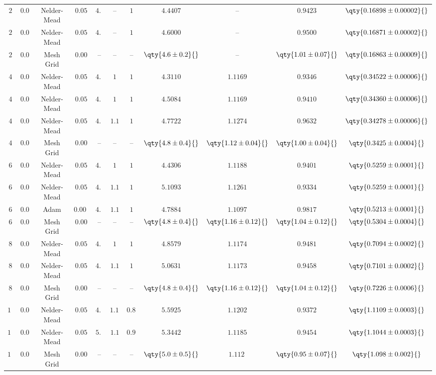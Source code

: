 \begin{tabular}{cc|ccccc|cccc}
    $2$ & $0.05$ & Nelder-Mead & $0.05$ & $4.5$ & -- & $1$ & $4.4407$ & -- & $0.9423$ & $\qty{0.16898 \pm 0.00002}{}$ \\
    \rowcolor{LightCyan}
    $2$ & $0.05$ & Nelder-Mead & $0.05$ & $4.6$ & -- & $1$ & $4.6000$ & -- & $0.9500$ & $\qty{0.16871 \pm 0.00002}{}$ \\
    $2$ & $0.05$ & Mesh Grid & $0.00$ & -- & -- & -- & $\qty{4.6 \pm 0.2}{}$ & -- & $\qty{1.01 \pm 0.07}{}$ & $\qty{0.16863 \pm 0.00009}{}$ \\
    $4$ & $0.05$ & Nelder-Mead & $0.05$ & $4.4$ & $1$ & $1$ & $4.3110$ & $1.1169$ & $0.9346$ & $\qty{0.34522 \pm 0.00006}{}$ \\
    $4$ & $0.05$ & Nelder-Mead & $0.05$ & $4.6$ & $1$ & $1$ & $4.5084$ & $1.1169$ & $0.9410$ & $\qty{0.34360 \pm 0.00006}{}$ \\
    \rowcolor{LightCyan}
    $4$ & $0.05$ & Nelder-Mead & $0.05$ & $4.7$\tnote{$\dagger$} & $1.1$ & $1$ & $4.7722$ & $1.1274$ & $0.9632$ & $\qty{0.34278 \pm 0.00006}{}$ \\
    $4$ & $0.05$ & Mesh Grid & $0.00$ & -- & -- & -- & $\qty{4.8 \pm 0.4}{}$ & $\qty{1.12 \pm 0.04}{}$ & $\qty{1.00 \pm 0.04}{}$ & $\qty{0.3425 \pm 0.0004}{}$ \\
    $6$ & $0.05$ & Nelder-Mead & $0.05$ & $4.6$ & $1$ & $1$ & $4.4306$ & $1.1188$ & $0.9401$ & $\qty{0.5259 \pm 0.0001}{}$ \\
    $6$ & $0.05$ & Nelder-Mead & $0.05$ & $4.8$\tnote{$\dagger$} & $1.1$ & $1$ & $5.1093$ & $1.1261$ & $0.9334$ & $\qty{0.5259 \pm 0.0001}{}$ \\
    \rowcolor{LightCyan}
    $6$ & $0.05$ & Adam\tnote{$\ddagger$} & $0.0005$ & $4.8$& $1.1$ & $1$ & $4.7884$ & $1.1097$ & $0.9817$ & $\qty{0.5213 \pm 0.0001}{}$ \\
    $6$ & $0.05$ & Mesh Grid & $0.00$ & -- & -- & -- & $\qty{4.8 \pm 0.4}{}$ & $\qty{1.16 \pm 0.12}{}$ & $\qty{1.04 \pm 0.12}{}$ & $\qty{0.5304 \pm 0.0004}{}$ \\
    $8$ & $0.05$ & Nelder-Mead & $0.05$ & $4.6$ & $1$ & $1$ & $4.8579$ & $1.1174$ & $0.9481$ & $\qty{0.7094 \pm 0.0002}{}$ \\
    \rowcolor{LightCyan}
    $8$ & $0.05$ & Nelder-Mead & $0.05$ & $4.8$\tnote{$\dagger$} & $1.1$ & $1$ & $5.0631$ & $1.1173$ & $0.9458$ & $\qty{0.7101 \pm 0.0002}{}$ \\
    $8$ & $0.05$ & Mesh Grid & $0.00$ & -- & -- & -- & $\qty{4.8 \pm 0.4}{}$ & $\qty{1.16 \pm 0.12}{}$ & $\qty{1.04 \pm 0.12}{}$ & $\qty{0.7226 \pm 0.0006}{}$ \\
    $12$\tnote{$*$} & $0.05$ & Nelder-Mead & $0.05$ & $4.8$ & $1.11$ & $0.83$ & $5.5925$ & $1.1202$ & $0.9372$ & $\qty{1.1109 \pm 0.0003}{}$ \\
    \rowcolor{LightCyan}
    $12$\tnote{$*$} & $0.05$ & Nelder-Mead & $0.05$ & $5.3$ & $1.1$ & $0.94$ & $5.3442$ & $1.1185$ & $0.9454$ & $\qty{1.1044 \pm 0.0003}{}$ \\
    $12$\tnote{$*$} & $0.05$ & Mesh Grid & $0.00$ & -- & -- & -- & $\qty{5.0 \pm 0.5}{}$ & $\qty{1.112}{}$\tnote{$**$} & $\qty{0.95 \pm 0.07}{}$ & $\qty{1.098 \pm 0.002}{}$ \\
\end{tabular}